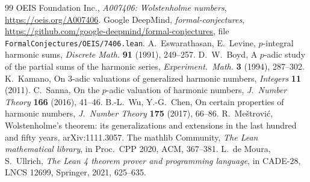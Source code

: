 \documentclass[11pt]{article}
\theoremstyle{remark}\newtheorem{remark}[theorem]{Remark}
\begin{document}
\begin{thebibliography}{99}
 OEIS Foundation Inc., \emph{A007406: Wolstenholme numbers}, \url{https://oeis.org/A007406}.
 Google DeepMind, \emph{formal-conjectures}, \url{https://github.com/google-deepmind/formal-conjectures}, file \nolinkurl{FormalConjectures/OEIS/7406.lean}.
 A.~Eswarathasan, E.~Levine, $p$-integral harmonic sums, \emph{Discrete Math.} \textbf{91} (1991), 249--257.
 D.~W.~Boyd, A $p$-adic study of the partial sums of the harmonic series, \emph{Experiment.\ Math.} \textbf{3} (1994), 287--302.
 K.~Kamano, On $3$-adic valuations of generalized harmonic numbers, \emph{Integers} \textbf{11} (2011).
 C.~Sanna, On the $p$-adic valuation of harmonic numbers, \emph{J.\ Number Theory} \textbf{166} (2016), 41--46.
 B.-L.~Wu, Y.-G.~Chen, On certain properties of harmonic numbers, \emph{J.\ Number Theory} \textbf{175} (2017), 66--86.
 R.~Me\v{s}trovi\'c, Wolstenholme's theorem: its generalizations and extensions in the last hundred and fifty years, arXiv:1111.3057.
 The mathlib Community, \emph{The Lean mathematical library}, in Proc.\ CPP 2020, ACM, 367--381.
 L.~de Moura, S.~Ullrich, \emph{The Lean 4 theorem prover and programming language}, in CADE-28, LNCS 12699, Springer, 2021, 625--635.
\end{thebibliography}
\end{document}
